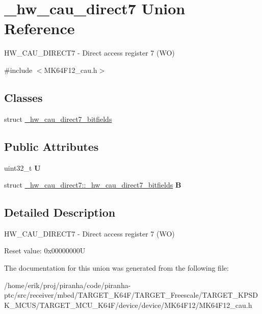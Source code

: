 \hypertarget{union__hw__cau__direct7}{}\section{\+\_\+hw\+\_\+cau\+\_\+direct7 Union Reference}
\label{union__hw__cau__direct7}


H\+W\+\_\+\+C\+A\+U\+\_\+\+D\+I\+R\+E\+C\+T7 -\/ Direct access register 7 (WO)  




{\ttfamily \#include $<$M\+K64\+F12\+\_\+cau.\+h$>$}

\subsection*{Classes}
\begin{DoxyCompactItemize}
\item 
struct \hyperlink{struct__hw__cau__direct7_1_1__hw__cau__direct7__bitfields}{\+\_\+hw\+\_\+cau\+\_\+direct7\+\_\+bitfields}
\end{DoxyCompactItemize}
\subsection*{Public Attributes}
\begin{DoxyCompactItemize}
\item 
uint32\+\_\+t {\bfseries U}\hypertarget{union__hw__cau__direct7_a3cd8be2cc2bd2284c551b8cab7359505}{}\label{union__hw__cau__direct7_a3cd8be2cc2bd2284c551b8cab7359505}

\item 
struct \hyperlink{struct__hw__cau__direct7_1_1__hw__cau__direct7__bitfields}{\+\_\+hw\+\_\+cau\+\_\+direct7\+::\+\_\+hw\+\_\+cau\+\_\+direct7\+\_\+bitfields} {\bfseries B}\hypertarget{union__hw__cau__direct7_a138d7cee19179868e6c224442f9c0b7b}{}\label{union__hw__cau__direct7_a138d7cee19179868e6c224442f9c0b7b}

\end{DoxyCompactItemize}


\subsection{Detailed Description}
H\+W\+\_\+\+C\+A\+U\+\_\+\+D\+I\+R\+E\+C\+T7 -\/ Direct access register 7 (WO) 

Reset value\+: 0x00000000U 

The documentation for this union was generated from the following file\+:\begin{DoxyCompactItemize}
\item 
/home/erik/proj/piranha/code/piranha-\/ptc/src/receiver/mbed/\+T\+A\+R\+G\+E\+T\+\_\+\+K64\+F/\+T\+A\+R\+G\+E\+T\+\_\+\+Freescale/\+T\+A\+R\+G\+E\+T\+\_\+\+K\+P\+S\+D\+K\+\_\+\+M\+C\+U\+S/\+T\+A\+R\+G\+E\+T\+\_\+\+M\+C\+U\+\_\+\+K64\+F/device/device/\+M\+K64\+F12/M\+K64\+F12\+\_\+cau.\+h\end{DoxyCompactItemize}
